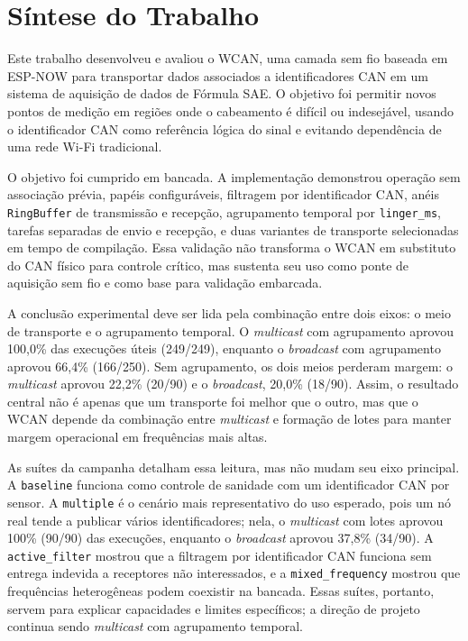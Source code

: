 \section{Síntese do Trabalho}

Este trabalho desenvolveu e avaliou o WCAN, uma camada sem fio baseada em
ESP-NOW para transportar dados associados a identificadores CAN em um sistema de
aquisição de dados de Fórmula SAE. O objetivo foi permitir novos pontos de
medição em regiões onde o cabeamento é difícil ou indesejável, usando o identificador CAN como referência lógica do sinal e evitando dependência de uma rede Wi-Fi
tradicional.

O objetivo foi cumprido em bancada. A implementação demonstrou operação sem
associação prévia, papéis configuráveis, filtragem por identificador CAN, anéis
\texttt{RingBuffer} de transmissão e recepção, agrupamento temporal por
\texttt{linger\_ms}, tarefas separadas de envio e recepção, e duas variantes de
transporte selecionadas em tempo de compilação. Essa validação não transforma o
WCAN em substituto do CAN físico para controle crítico, mas sustenta seu uso como
ponte de aquisição sem fio e como base para validação embarcada.

A conclusão experimental deve ser lida pela combinação entre dois eixos: o meio
de transporte e o agrupamento temporal. O \emph{multicast} com agrupamento
aprovou 100,0\% das execuções úteis (249/249), enquanto o \emph{broadcast} com
agrupamento aprovou 66,4\% (166/250). Sem agrupamento, os dois meios perderam
margem: o \emph{multicast} aprovou 22,2\% (20/90) e o \emph{broadcast},
20,0\% (18/90). Assim, o resultado central não é apenas que um transporte foi
melhor que o outro, mas que o WCAN depende da combinação entre \emph{multicast}
e formação de lotes para manter margem operacional em frequências mais altas.

As suítes da campanha detalham essa leitura, mas não mudam seu eixo principal. A
\texttt{baseline} funciona como controle de sanidade com um identificador CAN por sensor. A
\texttt{multiple} é o cenário mais representativo do uso esperado, pois um nó real
tende a publicar vários identificadores; nela, o \emph{multicast} com lotes
aprovou 100\% (90/90) das execuções, enquanto o \emph{broadcast} aprovou 37,8\% (34/90). A
\texttt{active\_filter} mostrou que a filtragem por identificador CAN funciona sem entrega
indevida a receptores não interessados, e a \texttt{mixed\_frequency} mostrou que
frequências heterogêneas podem coexistir na bancada. Essas suítes, portanto,
servem para explicar capacidades e limites específicos; a direção de projeto
continua sendo \emph{multicast} com agrupamento temporal.

